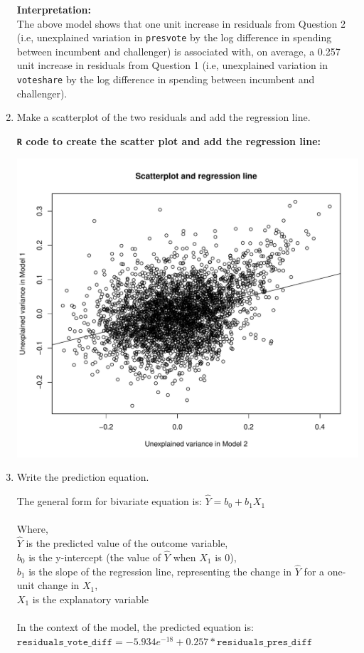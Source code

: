 \documentclass[12pt,letterpaper]{article}
\begin{document}
\begin{enumerate}
		\textbf{Interpretation:}\\
		The above model shows that one unit increase in residuals from Question 2 (i.e, unexplained variation in \texttt{presvote} by the log difference in spending between incumbent and challenger) is associated with, on average, a 0.257 unit increase in residuals from Question 1 (i.e, unexplained variation in \texttt{voteshare} by the log difference in spending between incumbent and challenger).\\
		
		\item Make a scatterplot of the two residuals and add the regression line.
		
		\textbf{\texttt{R} code to create the scatter plot and add the regression line:}
		  
		
		\begin{center}
			\includegraphics[width=15cm]{plot4.pdf}  
		\end{center}
		
		\pagebreak
		
		\item Write the prediction equation.
		
		\noindent The general form for bivariate equation is:
		$\hat{Y} = b_0 + b_1 X_1$\\
		\\Where,\\
		$\hat{Y}$ is the predicted value of the outcome variable,\\
		$b_0$ is the y-intercept (the value of $\hat{Y}$ when $X_1$ is 0),\\
		$b_1$ is the slope of the regression line, representing the change in $\hat{Y}$ for a one-unit change in $X_1$,\\
		$X_1$ is the explanatory variable\\
		\\
		In the context of the model, the predicted equation is:\\
		\textit{$\texttt{residuals\_vote\_diff} = -5.934e^{-18} + 0.257*\texttt{residuals\_pres\_diff}$}
		

\end{enumerate}
\end{document}
